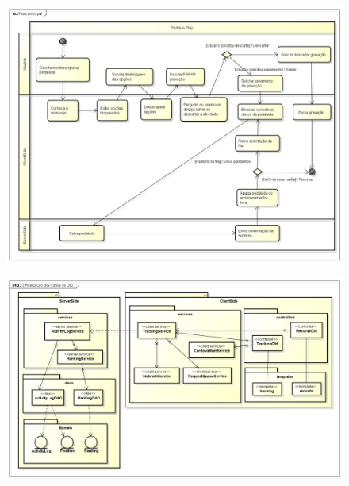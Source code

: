 \begin{figure}
\begin{minipage}{1.0\textwidth}
    \centerline{\includegraphics[width=35em]{figuras/trackingActivity.png}}
    \label{fig:trackingActivity}
\end{minipage}
\end{figure}

\begin{figure}
\begin{minipage}{1.0\textwidth}
    \centerline{\includegraphics[width=35em]{figuras/trackingClasses.png}}
    \label{fig:trackingClasses}
\end{minipage}
\end{figure}


